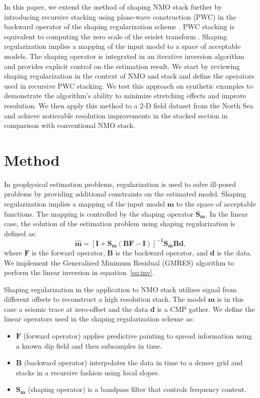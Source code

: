 In this paper, we extend the method of shaping NMO stack \cite[]{regimbal} further by introducing recursive stacking
using plane-wave construction (PWC) \cite[]{fomel7} in the backward operator of the shaping regularization scheme \cite[]{fomel}.
PWC stacking is equivalent to computing the zero scale of the seislet transform \cite[]{fomel3}.
Shaping regularization implies a mapping of the input 
model to a space of acceptable models. The shaping operator is integrated in an iterative inversion 
algorithm and provides explicit control on the estimation result. We start by reviewing shaping regularization 
in the context of NMO and stack and define the operators used in recursive PWC stacking. 
We test this approach on synthetic examples to demonstrate the algorithm's ability to minimize 
stretching effects and improve resolution. We then apply this method to a 2-D field dataset from 
the North Sea and achieve noticeable resolution improvements in the stacked section in comparison 
with conventional NMO stack.

\section{Method}
In geophysical estimation problems, regularization is 
used to solve ill-posed problems by providing additional constraints on the estimated model.
Shaping regularization \cite[]{fomel,fomel2} implies a mapping of the input model $\mathbf{m}$ to the space of acceptable functions. The mapping is controlled by the shaping operator $\mathbf{S_m}$. In the linear case, the solution of the estimation problem using shaping regularization is defined as:
\begin{equation}
\label{eq:inv}
\mathbf{\hat{m}=[I+S_m(BF-I)]^{-1}S_mBd},
\end{equation}
where $\mathbf{F}$ is the forward operator, $\mathbf{B}$ is the backward operator, and $\mathbf{d}$
is the data. We implement the Generalized Minimum Residual (GMRES) algorithm \cite[]{saad} to perform the linear inversion 
in equation~\ref{eq:inv}.

Shaping regularization in the application to NMO stack utilizes signal from different offsets
to reconstruct a high resolution stack. The model $\mathbf{m}$ is in this case a seismic trace at zero-offset and the 
data $\mathbf{d}$ is a CMP gather. We define the linear operators used in the shaping regularization 
scheme as:
\begin{itemize}
\item{$\mathbf{F}$ (forward operator) applies predictive painting \cite[]{fomel6} to spread information using a known dip field 
	and then subsamples in time.}
\item{$\mathbf{B}$ (backward operator) interpolates the data in time to a denser grid and stacks in a recursive fashion using local slopes.}
\item{$\mathbf{S_m}$ (shaping operator) is a bandpass filter that controls frequency content.}
\end{itemize}

